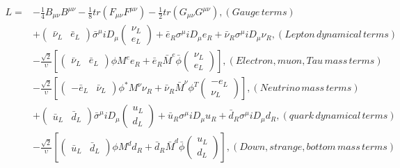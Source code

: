 \begin{equation}
 \begin{alignedat}{2}
  L = & -\frac{1}{4}B_{\mu\nu}B^{\mu\nu} - \frac{1}{8}tr(F_{\mu\nu}F^{\mu\nu}) - \frac{1}{2}tr(G_{\mu\nu}G^{\mu\nu}), (Gauge \, terms) \\
      & +\begin{pmatrix} \bar{\nu}_{L} & \bar{e}_{L} \end{pmatrix}\bar{\sigma}^{\mu}iD_{\mu}\begin{pmatrix} \nu_{L} \\ e_{L} \end{pmatrix} + \bar{e}_{R}\sigma^{\mu}iD_{\mu}e_{R} + \bar{\nu}_{R}\sigma^{\mu}iD_{\mu}\nu_{R}, (Lepton \, dynamical \, terms) \\
      & -\frac{\sqrt{2}}{\upsilon}[\begin{pmatrix} \bar{\nu}_{L} & \bar{e}_{L} \end{pmatrix}\phi M^{e}e_{R} + \bar{e}_{R}\bar{M}^{e}\bar{\phi}\begin{pmatrix} \nu_{L} \\ e_{L} \end{pmatrix}], (Electron, muon, Tau \, mass \, terms) \\
      & -\frac{\sqrt{2}}{\upsilon}[\begin{pmatrix} -\bar{e}_{L} & \bar{\nu}_{L} \end{pmatrix}\phi^{*} M^{\nu}\nu_{R} + \bar{\nu}_{R}\bar{M}^{\nu}\phi^{T}\begin{pmatrix} -e_{L} \\ \nu_{L} \end{pmatrix}], (Neutrino \, mass \, terms) \\
      & +\begin{pmatrix} \bar{u}_{L} & \bar{d}_{L} \end{pmatrix}\bar{\sigma}^{\mu}iD_{\mu}\begin{pmatrix} u_{L} \\ d_{L} \end{pmatrix} + \bar{u}_{R}\sigma^{\mu}iD_{\mu}u_{R} + \bar{d}_{R}\sigma^{\mu}iD_{\mu}d_{R}, (quark \, dynamical \, terms) \\
      & -\frac{\sqrt{2}}{\upsilon}[\begin{pmatrix} \bar{u}_{L} & \bar{d}_{L} \end{pmatrix}\phi M^{d}d_{R} + \bar{d}_{R}\bar{M}^{d}\bar{\phi}\begin{pmatrix} u_{L} \\ d_{L} \end{pmatrix}], (Down, strange, bottom \, mass \, terms) \\

\end{alignedat}
\end{equation}
